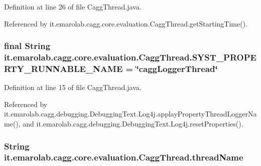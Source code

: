 Definition at line 26 of file Cagg\-Thread.\-java.



Referenced by it.\-emarolab.\-cagg.\-core.\-evaluation.\-Cagg\-Thread.\-get\-Starting\-Time().

\hypertarget{classit_1_1emarolab_1_1cagg_1_1core_1_1evaluation_1_1CaggThread_a538a6a9ae35d7beb1253b07ecc6e214a}{
\subsubsection[{S\-Y\-S\-T\-\_\-\-P\-R\-O\-P\-E\-R\-T\-Y\-\_\-\-R\-U\-N\-N\-A\-B\-L\-E\-\_\-\-N\-A\-M\-E}]{\setlength{\rightskip}{0pt plus 5cm}final String it.\-emarolab.\-cagg.\-core.\-evaluation.\-Cagg\-Thread.\-S\-Y\-S\-T\-\_\-\-P\-R\-O\-P\-E\-R\-T\-Y\-\_\-\-R\-U\-N\-N\-A\-B\-L\-E\-\_\-\-N\-A\-M\-E = \char`\"{}cagg\-Logger\-Thread\char`\"{}\hspace{0.3cm}{\ttfamily [static]}}}\label{classit_1_1emarolab_1_1cagg_1_1core_1_1evaluation_1_1CaggThread_a538a6a9ae35d7beb1253b07ecc6e214a}


Definition at line 15 of file Cagg\-Thread.\-java.



Referenced by it.\-emarolab.\-cagg.\-debugging.\-Debugging\-Text.\-Log4j.\-applay\-Property\-Thread\-Logger\-Name(), and it.\-emarolab.\-cagg.\-debugging.\-Debugging\-Text.\-Log4j.\-reset\-Properties().

\hypertarget{classit_1_1emarolab_1_1cagg_1_1core_1_1evaluation_1_1CaggThread_a9f93a5dd960d289f5e2a1889f8b6f55b}{
\subsubsection[{thread\-Name}]{\setlength{\rightskip}{0pt plus 5cm}String it.\-emarolab.\-cagg.\-core.\-evaluation.\-Cagg\-Thread.\-thread\-Name\hspace{0.3cm}{\ttfamily [private]}}}\label{classit_1_1emarolab_1_1cagg_1_1core_1_1evaluation_1_1CaggThread_a9f93a5dd960d289f5e2a1889f8b6f55b}


